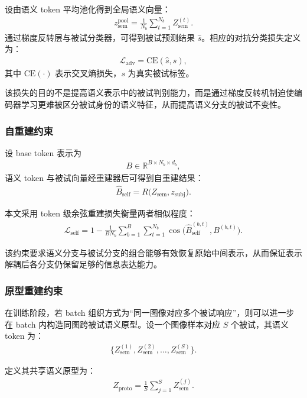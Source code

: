 设由语义 token 平均池化得到全局语义向量：
\begin{align}
  z_{\mathrm{sem}}^{\mathrm{pool}} = \frac{1}{N_b} \sum_{t=1}^{N_b} Z_{\mathrm{sem}}^{(t)}.
\end{align}
通过梯度反转层与被试分类器，可得到被试预测结果 $\hat{s}$。相应的对抗分类损失定义为：
\begin{align}
  \mathcal{L}_{\mathrm{adv}} = \mathrm{CE}(\hat{s}, s),
\end{align}
其中 $\mathrm{CE}(\cdot)$ 表示交叉熵损失，$s$ 为真实被试标签。

该损失的目的不是提高语义表示中的被试判别能力，而是通过梯度反转机制迫使编码器学习更难被区分被试身份的语义特征，从而提高语义分支的被试不变性。

\subsubsection{自重建约束}

设 base token 表示为
\begin{align}
  B \in \mathbb{R}^{B \times N_b \times d_b},
\end{align}
语义 token 与被试向量经重建器后可得到自重建结果：
\begin{align}
  \hat{B}_{\mathrm{self}} = R\bigl(Z_{\mathrm{sem}}, z_{\mathrm{subj}}\bigr).
\end{align}

本文采用 token 级余弦重建损失衡量两者相似程度：
\begin{align}
  \mathcal{L}_{\mathrm{self}} = 1 - \frac{1}{B N_b} \sum_{b=1}^{B} \sum_{t=1}^{N_b} \cos\bigl(\hat{B}_{\mathrm{self}}^{(b,t)}, B^{(b,t)}\bigr).
\end{align}

该约束要求语义分支与被试分支的组合能够有效恢复原始中间表示，从而保证表示解耦后各分支仍保留足够的信息表达能力。

\subsubsection{原型重建约束}

在训练阶段，若 batch 组织方式为“同一图像对应多个被试响应”，则可以进一步在 batch 内构造同图跨被试语义原型。设一个图像样本对应 $S$ 个被试，其语义 token 为：
\begin{align}
  \{Z_{\mathrm{sem}}^{(1)}, Z_{\mathrm{sem}}^{(2)}, \dots, Z_{\mathrm{sem}}^{(S)}\}.
\end{align}

定义其共享语义原型为：
\begin{align}
  Z_{\mathrm{proto}} = \frac{1}{S} \sum_{j=1}^{S} Z_{\mathrm{sem}}^{(j)}.
\end{align}

